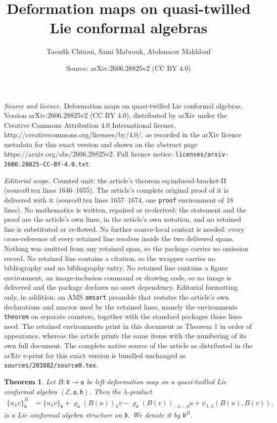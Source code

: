 \documentclass[10pt,a4paper]{amsart}
\title{\sf Deformation maps on quasi-twilled Lie conformal algebras}
\author{Taoufik Chtioui, Sami Mabrouk, Abdenacer Makhlouf}
\date{Source: arXiv:2606.28825v2 (CC BY 4.0)}
\newtheorem{theorem}{Theorem}
\def\Ep{\mathcal{E}}
\def\Vs{\mathfrak{a}}
\def\Ws{\mathfrak{b}}
\def\la{\lambda}
\def\p{\partial}
\def\rep{\varrho}
\begin{document}
\maketitle

\noindent\emph{Source and licence.} \sf Deformation maps on quasi-twilled Lie conformal algebras. Version arXiv:2606.28825v2 (CC BY 4.0), distributed by arXiv under the Creative Commons Attribution 4.0 International licence, http://creativecommons.org/licenses/by/4.0/, as recorded in the arXiv licence metadata for this exact version and shown on the abstract page https://arxiv.org/abs/2606.28825v2. Full licence notice: \texttt{licenses/arxiv-2606.28825-CC-BY-4.0.txt}.\par\smallskip

\noindent\textit{Editorial scope.} Counted unit: the article's theorem eq:induced-bracket-II (source0.tex lines 1646--1655). The article's complete original proof of it is delivered with it (source0.tex lines 1657--1674, one \texttt{proof} environment of 18 lines). No mathematics is written, repaired or re-derived: the statement and the proof are the article's own lines, in the article's own notation, and no retained line is substituted or re-flowed.  No further source-local context is needed: every cross-reference of every retained line resolves inside the two delivered spans.  Nothing was omitted from any retained span, so the package carries no omission record.  No retained line contains a citation, so the wrapper carries no bibliography and no bibliography entry.  No retained line contains a figure environment, an image-inclusion command or drawing code, so no image is delivered and the package declares no asset dependency.  Editorial formatting only, in addition: an AMS \texttt{amsart} preamble that restates the article's own declarations and macros used by the retained lines, namely the environments \texttt{theorem} on separate counters, together with the standard packages those lines need.  The retained environments print in this document as Theorem 1 in order of appearance, whereas the article prints the same items with the numbering of its own full document.  The complete native source of the article as distributed in the arXiv e-print for this exact version is bundled unchanged as \texttt{sources/203882/source0.tex}.
\begin{theorem}
Let $B: \Ws \to \Vs$ be left deformation map on a quasi-twilled Lie conformal algebra $(\Ep,\Vs,\Ws)$. Then the $\la$-product 
\begin{align}
 \{u_\la v\}^B_\Ws
  &= \{u_\la v\}_\Ws + \rep_\Vs(B(u))_\la v - \rep_\Vs(B(v))_{-\la-\p}u
     + \psi_{1,\la}(B(u),B(v)), 
  \label{eq:induced-bracket-II}   
\end{align}
is a Lie conformal algebra structure on $\Ws$. We denote it by $\Ws^B$. 
\end{theorem}
\end{document}
